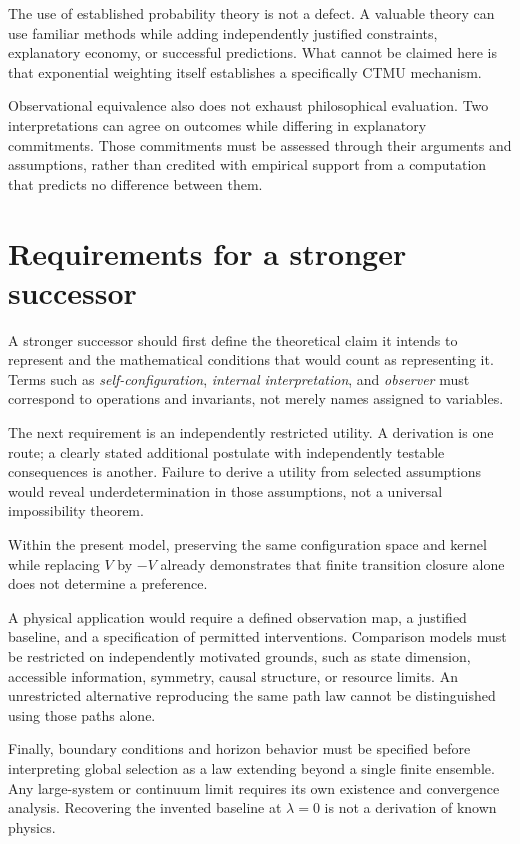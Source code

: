 \documentclass[11pt]{article}
\theoremstyle{remark}
\begin{document}
The use of established probability theory is not a defect. A valuable theory can use familiar methods while adding independently justified constraints, explanatory economy, or successful predictions. What cannot be claimed here is that exponential weighting itself establishes a specifically CTMU mechanism.

Observational equivalence also does not exhaust philosophical evaluation. Two interpretations can agree on outcomes while differing in explanatory commitments. Those commitments must be assessed through their arguments and assumptions, rather than credited with empirical support from a computation that predicts no difference between them.

\section{Requirements for a stronger successor}

A stronger successor should first define the theoretical claim it intends to represent and the mathematical conditions that would count as representing it. Terms such as \emph{self-configuration}, \emph{internal interpretation}, and \emph{observer} must correspond to operations and invariants, not merely names assigned to variables.

The next requirement is an independently restricted utility. A derivation is one route; a clearly stated additional postulate with independently testable consequences is another. Failure to derive a utility from selected assumptions would reveal underdetermination in those assumptions, not a universal impossibility theorem.

Within the present model, preserving the same configuration space and kernel while replacing \(V\) by \(-V\) already demonstrates that finite transition closure alone does not determine a preference.

A physical application would require a defined observation map, a justified baseline, and a specification of permitted interventions. Comparison models must be restricted on independently motivated grounds, such as state dimension, accessible information, symmetry, causal structure, or resource limits. An unrestricted alternative reproducing the same path law cannot be distinguished using those paths alone.

Finally, boundary conditions and horizon behavior must be specified before interpreting global selection as a law extending beyond a single finite ensemble. Any large-system or continuum limit requires its own existence and convergence analysis. Recovering the invented baseline at \(\lambda=0\) is not a derivation of known physics.
\end{document}
